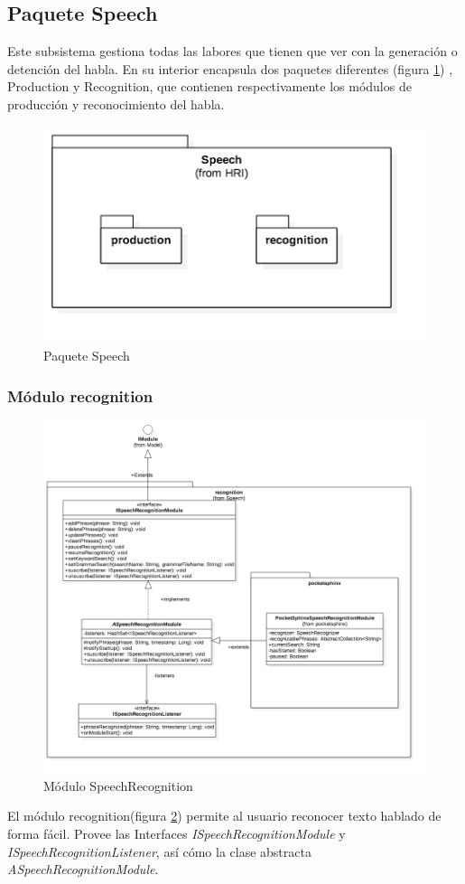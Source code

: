 \subsection{Paquete Speech}
Este subsistema gestiona todas las labores que tienen que ver con la generación o detención del habla. En su interior encapsula dos paquetes diferentes (figura \ref{fig:speech-package}) , Production y Recognition, que contienen respectivamente los módulos de producción y reconocimiento del habla.
\begin{figure}
	\centering
	\includegraphics[width=0.8\linewidth]{imagenes/diagramas/Speech.png}
	\caption{Paquete Speech}
	\label{fig:speech-package}
\end{figure}

\subsubsection{Módulo recognition}
\begin{figure}
	\centering
	\includegraphics[width=1\linewidth]{imagenes/diagramas/SpeechRecognitionModule.png}
	\caption{Módulo SpeechRecognition}
	\label{fig:speech-recognition-module}
\end{figure}
El módulo recognition(figura \ref{fig:speech-recognition-module}) permite al usuario reconocer texto hablado de forma fácil.
Provee las Interfaces \textit{ISpeechRecognitionModule} y \textit{ISpeechRecognitionListener}, así cómo la clase abstracta \textit{ASpeechRecognitionModule}.


